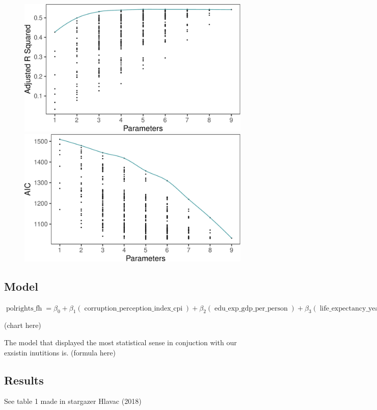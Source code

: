 \documentclass[
  english,
  man,floatsintext]{apa6}
\begin{document}
\begin{figure}
\includegraphics[width=0.5\linewidth]{paper_files/figure-latex/unnamed-chunk-2-1} \includegraphics[width=0.5\linewidth]{paper_files/figure-latex/unnamed-chunk-2-2} \caption{ }\label{fig:unnamed-chunk-2}
\end{figure}

\hypertarget{model}{%
\subsection{Model}\label{model}}

\(\operatorname{polrights\_fh} = \beta_{0} + \beta_{1}(\operatorname{corruption\_perception\_index\_cpi}) + \beta_{2}(\operatorname{edu\_exp\_gdp\_per\_person}) + \beta_{3}(\operatorname{life\_expectancy\_years}) + \beta_{4}(\operatorname{military\_spending\_pct\_of\_gdp}) + \beta_{5}(\operatorname{murder\_per\_mil\_people}) + \epsilon\)

(chart here)

The model that displayed the most statistical sense in conjuction with our exsistin inutitions is.
(formula here)

\hypertarget{results}{%
\subsection{Results}\label{results}}

See table 1 made in stargazer Hlavac (2018)
\end{document}

